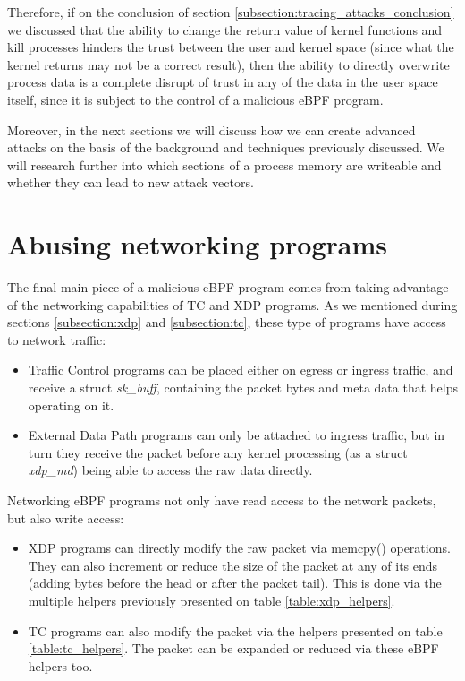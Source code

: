 Therefore, if on the conclusion of section \ref{subsection:tracing_attacks_conclusion} we discussed that the ability to change the return value of kernel functions and kill processes hinders the trust between the user and kernel space (since what the kernel returns may not be a correct result), then the ability to directly overwrite process data is a complete disrupt of trust in any of the data in the user space itself, since it is subject to the control of a malicious eBPF program.

Moreover, in the next sections we will discuss how we can create advanced attacks on the basis of the background and techniques previously discussed. We will research further into which sections of a process memory are writeable and whether they can lead to new attack vectors.


\section{Abusing networking programs}\label{section:abusing_networking}
The final main piece of a malicious eBPF program comes from taking advantage of the networking capabilities of TC and XDP programs. As we mentioned during sections \ref{subsection:xdp} and \ref{subsection:tc}, these type of programs have access to network traffic:
\begin{itemize}
\item Traffic Control programs can be placed either on egress or ingress traffic, and receive a struct \textit{sk\_buff}, containing the packet bytes and meta data that helps operating on it.
\item External Data Path programs can only be attached to ingress traffic, but in turn they receive the packet before any kernel processing (as a struct \textit{xdp\_md}) being able to access the raw data directly.
\end{itemize}

Networking eBPF programs not only have read access to the network packets, but also write access:
\begin{itemize}
\item XDP programs can directly modify the raw packet via memcpy() operations. They can also increment or reduce the size of the packet at any of its ends (adding bytes before the head or after the packet tail). This is done via the multiple helpers previously presented on table \ref{table:xdp_helpers}.
\item TC programs can also modify the packet via the helpers presented on table \ref{table:tc_helpers}. The packet can be expanded or reduced via these eBPF helpers too.
\end{itemize} 

